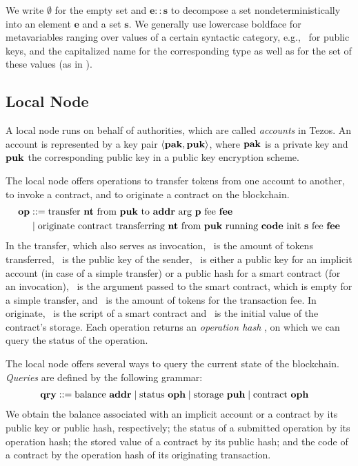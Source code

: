 \documentclass[a4paper]{llncs}
\begin{document}
We write $\emptyset$ for the empty set and $\mathbf{e :: s}$ to
decompose a set nondeterministically into an element $\mathbf{e}$ and a set
$\mathbf{s}$. We generally use lowercase boldface for metavariables
ranging over values of a certain syntactic category, e.g., \PUK\ for
public keys, and the capitalized name for the
corresponding type as well as for the set of these values (as in \TPUK).

\subsection{Local Node}
\label{sec:local-node}

A local node runs on behalf of authorities, which are called
\emph{accounts} in Tezos. An account is represented by a key pair $\Angle{
  \PAK, \PUK
} $, where $\PAK$ is a private key and $\PUK$ the corresponding public
key in a public key encryption scheme.

The local node offers operations to transfer tokens from one account
to another, to invoke a contract, and to originate a contract on the blockchain.
\begin{align*}
  \OP &::= \TRANSFER[\PARAMETER]\NTEZ\PUK\ADDR\MTEZ
  \\&\mid \ORIGINATE\NTEZ\PUK\CODE\INIT\MTEZ
\end{align*}
In the transfer, which also serves as invocation, \NTEZ\ is the amount of tokens transferred, \PUK\ is the public key of the
sender, \ADDR\ is either a public 
key for an implicit account (in case of a simple transfer)  or a
public hash for a smart contract (for an invocation), \PARAMETER\ is
the argument passed to the smart contract, 
which is empty for a simple transfer, and \MTEZ\ is
the amount of tokens for the transaction fee. In originate,  \CODE\ is
the script of a smart contract and \INIT\ is the initial value of the
contract's storage. Each operation returns an \emph{operation hash}
\OPH, on which we can query the status of the operation.

The local node offers several ways to query the current state of
the blockchain.
\emph{Queries} are defined by the following grammar:
\begin{align*}
  \QRY & ::=
         \GETBALANCE\ADDR
  \mid \GETSTATUS\OPH
  \mid \GETSTORAGE\PUH
  \mid \GETCONTRACT\OPH
\end{align*}
We obtain the balance associated with an implicit account or a
contract by its public key or public hash, respectively; the status of
a submitted operation by its operation hash; the stored value of a
contract by its public hash; and the code of a contract by the
operation hash of its originating transaction.
\end{document}
